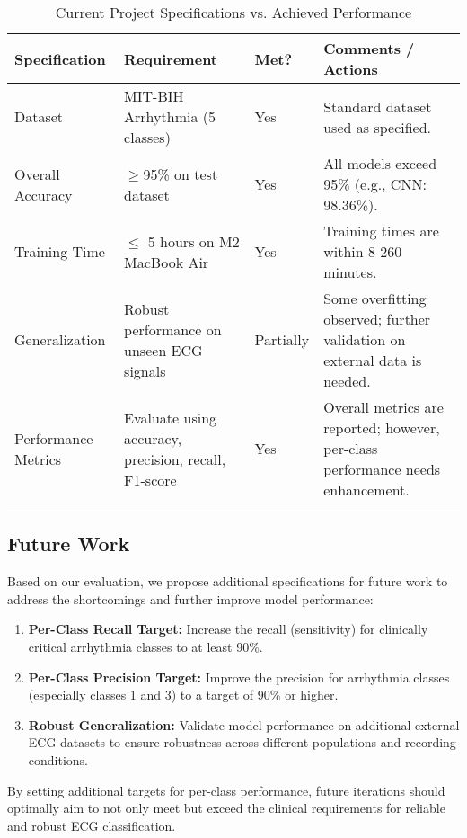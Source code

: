 \begin{table}[b]
    \centering
    \caption{Current Project Specifications vs. Achieved Performance}
    \label{tab:current_specs}
    \begin{tabular}{|p{2cm}|p{4.0cm}|p{1cm}|p{5cm}|}
        \hline
        \textbf{Specification} & \textbf{Requirement} & \textbf{Met?} & \textbf{Comments / Actions} \\
        \hline
        Dataset & MIT-BIH Arrhythmia (5 classes) & Yes & Standard dataset used as specified. \\
        \hline
        Overall Accuracy & $\geq$95\% on test dataset & Yes & All models exceed 95\% (e.g., CNN: 98.36\%). \\
        \hline
        Training Time & $\leq$ 5 hours on M2 MacBook Air & Yes & Training times are within 8-260 minutes. \\
        \hline
        Generalization & Robust performance on unseen ECG signals & Partially & Some overfitting observed; further validation on external data is needed. \\
        \hline
        Performance Metrics & Evaluate using accuracy, precision, recall, F1-score & Yes & Overall metrics are reported; however, per-class performance needs enhancement. \\
        \hline
    \end{tabular}
\end{table}

\subsection{Future Work}
Based on our evaluation, we propose additional specifications for future work to address the shortcomings and further improve model performance:

\begin{enumerate}
    \item \textbf{Per-Class Recall Target:} Increase the recall (sensitivity) for clinically critical arrhythmia classes to at least 90\%.
    \item \textbf{Per-Class Precision Target:} Improve the precision for arrhythmia classes (especially classes 1 and 3) to a target of 90\% or higher.
    \item \textbf{Robust Generalization:} Validate model performance on additional external ECG datasets to ensure robustness across different populations and recording conditions.
\end{enumerate}

By setting additional targets for per-class performance, future iterations should optimally aim to not only meet but exceed the clinical requirements for reliable and robust ECG classification.
